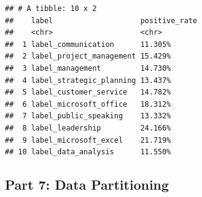 \documentclass[
]{article}
\begin{document}
\begin{verbatim}
## # A tibble: 10 x 2
##    label                    positive_rate
##    <chr>                    <chr>        
##  1 label_communication      11.305%      
##  2 label_project_management 15.429%      
##  3 label_management         14.730%      
##  4 label_strategic_planning 13.437%      
##  5 label_customer_service   14.782%      
##  6 label_microsoft_office   18.312%      
##  7 label_public_speaking    13.332%      
##  8 label_leadership         24.166%      
##  9 label_microsoft_excel    21.719%      
## 10 label_data_analysis      11.550%
\end{verbatim}

\subsection{Part 7: Data Partitioning}\label{part-7-data-partitioning}
\end{document}
